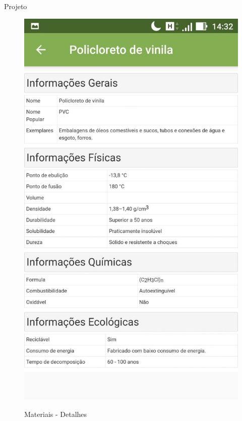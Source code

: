 \documentclass[
	12pt,				%
	openright,			%
	twoside,			%
	a4paper,			%
	english,			%
	french,				%
	spanish,			%
	brazil				%
	]{abntex2}
\begin{document}
\begin{chapter}{Projeto}
\begin{figure}[htb]
\begin{minipage}{0.45\textwidth}
    \caption{Materiais - Detalhes}
    \includegraphics[scale=0.35]{media/tela_material__details_act_2.jpg}
     \label{fig:tela_material__details_act_2}
  \end{minipage}
\end{figure}


\begin{lstlisting}[numbers=none,basicstyle=\small,
caption={ActivityMaterialDetails.java},
title={ActivityMaterialDetails.java},
label={ActivityMaterialDetails.java}]


\end{lstlisting}
\end{chapter}
\end{document}
